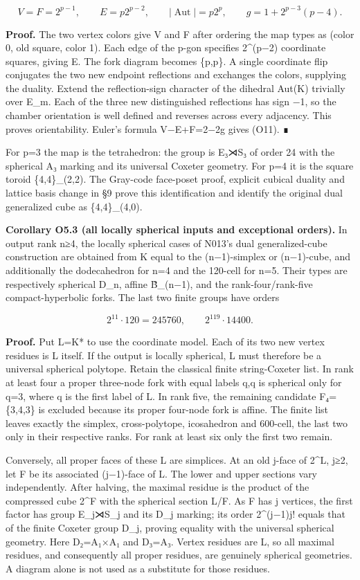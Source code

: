 \documentclass[
  10pt,
  letterpaper,
]{article}
\begin{document}
\[
V=F=2^{p-1},\qquad E=p2^{p-2},\qquad
|\operatorname{Aut}|=p2^p,\qquad
g=1+2^{p-3}(p-4).
\tag{O11}
\]

\textbf{Proof.} The two vertex colors give V and F after ordering the
map types as (color 0, old square, color 1). Each edge of the p-gon
specifies 2\^{}(p−2) coordinate squares, giving E. The fork diagram
becomes \{p,p\}. A single coordinate flip conjugates the two new
endpoint reflections and exchanges the colors, supplying the duality.
Extend the reflection-sign character of the dihedral Aut(K) trivially
over E\_m. Each of the three new distinguished reflections has sign −1,
so the chamber orientation is well defined and reverses across every
adjacency. This proves orientability. Euler's formula V−E+F=2−2g gives
(O11). ∎

For p=3 the map is the tetrahedron: the group is E₃⋊S₃ of order 24 with
the spherical A₃ marking and its universal Coxeter geometry. For p=4 it
is the square toroid \{4,4\}\_(2,2). The Gray-code face-poset proof,
explicit cubical duality and lattice basis change in §9 prove this
identification and identify the original dual generalized cube as
\{4,4\}\_(4,0).

\textbf{Corollary O5.3 (all locally spherical inputs and exceptional
orders).} In output rank n≥4, the locally spherical cases of N013's dual
generalized-cube construction are obtained from K equal to the
(n−1)-simplex or (n−1)-cube, and additionally the dodecahedron for n=4
and the 120-cell for n=5. Their types are respectively spherical D\_n,
affine B̃\_(n−1), and the rank-four/rank-five compact-hyperbolic forks.
The last two finite groups have orders

\[
2^{11}\cdot120=245760,
\qquad 2^{119}\cdot14400.
\tag{O12}
\]

\textbf{Proof.} Put L=K* to use the coordinate model. Each of its two
new vertex residues is L itself. If the output is locally spherical, L
must therefore be a universal spherical polytope. Retain the classical
finite string-Coxeter list. In rank at least four a proper three-node
fork with equal labels q,q is spherical only for q=3, where q is the
first label of L. In rank five, the remaining candidate F₄=\{3,4,3\} is
excluded because its proper four-node fork is affine. The finite list
leaves exactly the simplex, cross-polytope, icosahedron and 600-cell,
the last two only in their respective ranks. For rank at least six only
the first two remain.

Conversely, all proper faces of these L are simplices. At an old j-face
of 2\^{}L, j≥2, let F be its associated (j−1)-face of L. The lower and
upper sections vary independently. After halving, the maximal residue is
the product of the compressed cube 2\^{}F with the spherical section
L/F. As F has j vertices, the first factor has group E\_j⋊S\_j and its
D\_j marking; its order 2\^{}(j−1)j! equals that of the finite Coxeter
group D\_j, proving equality with the universal spherical geometry. Here
D₂=A₁×A₁ and D₃=A₃. Vertex residues are L, so all maximal residues, and
consequently all proper residues, are genuinely spherical geometries. A
diagram alone is not used as a substitute for those residues.
\end{document}
